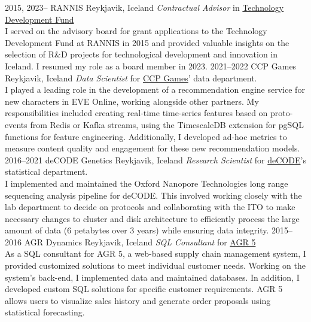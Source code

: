 \documentclass[]{cv} %
\begin{document}
\begin{entrylist}
\entry
{2015, 2023--}
{RANNIS}
{Reykjavik, Iceland}
{\emph{Contractual Advisor} in 
	\href{http://www.rannis.is/sjodir/rannsoknir/taeknithrounarsjodur/fagrad/}{Technology
		Development Fund}\\
	I served on the advisory board for grant applications to the Technology Development Fund at RANNIS in 2015 and provided valuable insights on the selection of R\&D projects for technological development and innovation in Iceland. 
	I resumed my role as a board member in 2023.
}
\entry
{2021--2022}
{CCP Games}
{Reykjavik, Iceland}
{\emph{Data Scientist} for
	\href{https://www.ccpgames.com/}{CCP Games}' data department.\\
I played a leading role in the development of a recommendation engine service for new characters in EVE Online, working alongside other partners. My responsibilities included creating real-time time-series features based on proto-events from Redis or Kafka streams, using the TimescaleDB extension for pgSQL functions for feature engineering. Additionally, I developed ad-hoc metrics to measure content quality and engagement for these new recommendation models.
}
\entry
{2016--2021}
{deCODE Genetics}
{Reykjavik, Iceland}
{\emph{Research Scientist} for
    \href{https://www.decode.com/}{deCODE}'s statistical department.\\
    I implemented and maintained the Oxford Nanopore Technologies long range sequencing analysis pipeline for deCODE. This involved working closely with the lab department to decide on protocols and collaborating with the ITO to make necessary changes to cluster and disk architecture to efficiently process the large amount of data (6 petabytes over 3 years) while ensuring data integrity. 
}
\entry
{2015--2016}
{AGR Dynamics}
{Reykjavik, Iceland}
{\emph{SQL Consultant} for
    \href{http://agrdynamics.com/}{AGR 5}\\
As a SQL consultant for AGR 5, a web-based supply chain management system, I provided customized solutions to meet individual customer needs. Working on the system's back-end, I implemented data and maintained databases. In addition, I developed custom SQL solutions for specific customer requirements. AGR 5 allows users to visualize sales history and generate order proposals using statistical forecasting.
}    
\end{entrylist}
\end{document}
